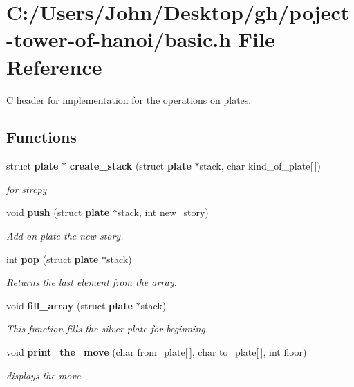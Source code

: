 \section{C\+:/\+Users/\+John/\+Desktop/gh/poject-\/tower-\/of-\/hanoi/basic.h File Reference}
\label{basic_8h}


C header for implementation for the operations on plates.  


\subsection*{Functions}
\begin{DoxyCompactItemize}
\item 
struct \textbf{ plate} $\ast$ \textbf{ create\+\_\+stack} (struct \textbf{ plate} $\ast$stack, char kind\+\_\+of\+\_\+plate[$\,$])
\begin{DoxyCompactList}\small\item\em for strcpy \end{DoxyCompactList}\item 
void \textbf{ push} (struct \textbf{ plate} $\ast$stack, int new\+\_\+story)
\begin{DoxyCompactList}\small\item\em Add on plate the new story. \end{DoxyCompactList}\item 
int \textbf{ pop} (struct \textbf{ plate} $\ast$stack)
\begin{DoxyCompactList}\small\item\em Returns the last element from the array. \end{DoxyCompactList}\item 
void \textbf{ fill\+\_\+array} (struct \textbf{ plate} $\ast$stack)
\begin{DoxyCompactList}\small\item\em This function fills the silver plate for beginning. \end{DoxyCompactList}\item 
void \textbf{ print\+\_\+the\+\_\+move} (char from\+\_\+plate[$\,$], char to\+\_\+plate[$\,$], int floor)
\begin{DoxyCompactList}\small\item\em displays the move \end{DoxyCompactList}\end{DoxyCompactItemize}


